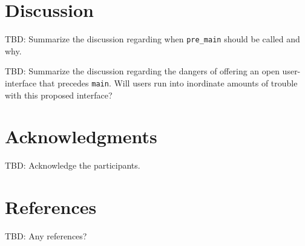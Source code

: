 \documentclass[11pt]{article}
\begin{document}
\section{Discussion}

TBD: Summarize the discussion regarding when \lstinline{pre_main}
should be called and why.

TBD: Summarize the discussion regarding the dangers of
offering an open user-interface that precedes \lstinline{main}.
Will users run into inordinate amounts of trouble with this
proposed interface?

\section{Acknowledgments}

TBD: Acknowledge the participants.

\section{References}
\renewcommand{\section}[2]{}%
\begin{thebibliography}{9}

TBD: Any references?


\end{thebibliography}
\end{document}

